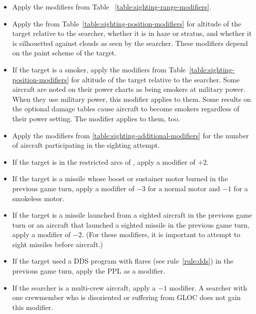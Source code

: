 {\begin{itemize}
    \item {} Apply the modifiers from Table ~\ref{table:sighting-range-modifiers}.
    \item {} Apply the from Table~\ref{table:sighting-position-modifiers} for altitude of the target relative to the searcher, whether it is in haze or stratus, and whether it is silhouetted against clouds as seen by the searcher. These modifiers depend on the paint scheme of the target.
    \item {} If the target is a smoker, apply the modifiers from Table~\ref{table:sighting-position-modifiers} for altitude of the target relative to the searcher. Some aircraft are noted on their power charts as being smokers at military power. When they use military power, this modifier applies to them. Some results on the optional damage tables cause aircraft to become smokers regardless of their power setting. The modifier applies to them, too.
    \item {} Apply the modifiers from \ref{table:sighting-additional-modifiers} for the number of aircraft participating in the sighting attempt. 
    \item {} If the target is in the restricted arcs of , apply a modifier of $+2$.
    \item {} If the target is a missile whose boost or sustainer motor burned in the previous game turn, apply a modifier of $-3$ for a normal motor and $-1$ for a smokeless motor.
    \item {} If the target is a missile launched from a sighted aircraft in the previous game turn or an aircraft that launched a sighted missile in the previous game turn, apply a modifier of $-2$. (For these modifiers, it is important to attempt to sight missiles before aircraft.)
    \item {} If the target used a DDS program with flares (see rule~\ref{rule:dds}) in the previous game turn, apply the PPL as a modifier.
    \item {} If the searcher is a multi-crew aircraft,    
    apply a $-1$ modifier. A searcher with one crewmember who is disoriented or suffering from GLOC does not gain this modifier.

\end{itemize}}
